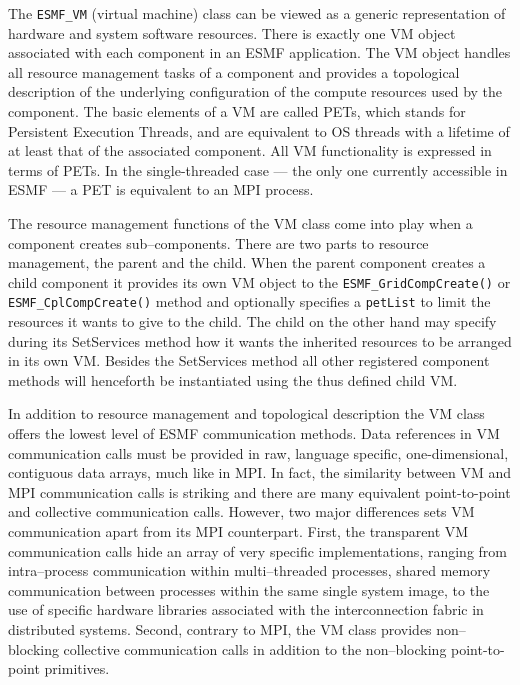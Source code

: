 
The {\tt ESMF\_VM} (virtual machine) class can be viewed as a generic representation of hardware and system software resources. There is exactly one VM object associated with each component in an ESMF application. The VM object handles all resource management tasks of a component and provides a topological description of the underlying configuration of the compute resources used by the component. The basic elements of a VM are called PETs, which stands for Persistent Execution Threads, and are equivalent to OS threads with a lifetime of at least that of the associated component. All VM functionality is expressed in terms of PETs. In the single-threaded case --- the only one currently accessible in ESMF --- a PET is equivalent to an MPI process. 

The resource management functions of the VM class come into play when a component creates sub--components. There are two parts to resource management, the parent and the child. When the parent component creates a child component it provides its own VM object to the {\tt ESMF\_GridCompCreate()} or {\tt ESMF\_CplCompCreate()} method and optionally specifies a {\tt petList} to limit the resources it wants to give to the child. The child on the other hand may specify during its SetServices method how it wants the inherited resources to be arranged in its own VM. Besides the SetServices method all other registered component methods will henceforth be instantiated using the thus defined child VM.

In addition to resource management and topological description the VM class offers the lowest level of ESMF communication methods. Data references in VM communication calls must be provided in raw, language specific, one-dimensional, contiguous data arrays, much like in MPI. In fact, the similarity between VM and MPI communication calls is striking and there are many equivalent point-to-point and collective communication calls. However, two major differences sets VM communication apart from its MPI counterpart. First, the transparent VM communication calls hide an array of very specific implementations, ranging from intra--process communication within multi--threaded processes, shared memory communication between processes within the same single system image, to the use of specific hardware libraries associated with the interconnection fabric in distributed systems. Second, contrary to MPI, the VM class provides non--blocking collective communication calls in addition to the non--blocking point-to-point primitives.
